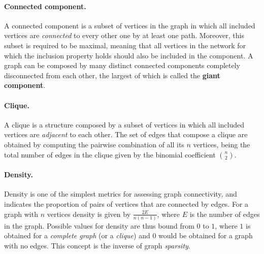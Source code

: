 \paragraph*{Connected component.}
A connected component is a subset of vertices in the graph in which all included vertices are \textit{connected} to every other one by at least one path.
Moreover, this subset is required to be maximal, meaning that all vertices in the network for which the inclusion property holds should also be included in the component. 
A graph can be composed by many distinct connected components completely disconnected from each other, the largest of which is called the \textbf{giant component}.

\paragraph*{Clique.}
A clique is a structure composed by a subset of vertices in which all included vertices are \textit{adjacent} to each other.
The set of edges that compose a clique are obtained by computing the pairwise combination of all its $n$ vertices, being the total number of edges in the clique given by the binomial coefficient $\binom{n}{2}$.

\paragraph*{Density.}
Density is one of the simplest metrics for assessing graph connectivity, and indicates the proportion of pairs of vertices that are connected by edges.
For a graph with $n$ vertices density is given by $\frac{2E}{n(n-1)}$, where $E$ is the number of edges in the graph.
Possible values for density are thus bound from $0$ to $1$, where $1$ is obtained for a \textit{complete graph} (or a \textit{clique}) and $0$ would be obtained for a graph with no edges.
This concept is the inverse of graph \textit{sparsity}. 

